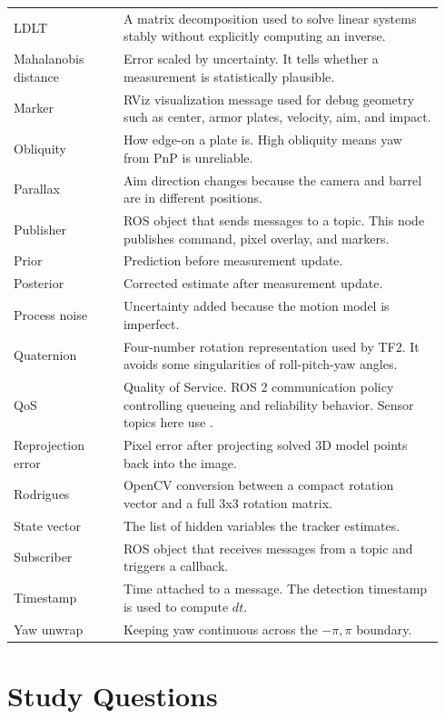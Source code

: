 \documentclass[11pt,a4paper]{article}
\newcommand{\code}[1]{\ifmmode\text{\ttfamily\detokenize{#1}}\else\texttt{\detokenize{#1}}\fi}
\begin{document}
\begin{longtable}{p{0.24\linewidth} p{0.70\linewidth}}
LDLT & A matrix decomposition used to solve linear systems stably without explicitly computing an inverse. \\
Mahalanobis distance & Error scaled by uncertainty. It tells whether a measurement is statistically plausible. \\
Marker & RViz visualization message used for debug geometry such as center, armor plates, velocity, aim, and impact. \\
Obliquity & How edge-on a plate is. High obliquity means yaw from PnP is unreliable. \\
Parallax & Aim direction changes because the camera and barrel are in different positions. \\
Publisher & ROS object that sends messages to a topic. This node publishes command, pixel overlay, and markers. \\
Prior & Prediction before measurement update. \\
Posterior & Corrected estimate after measurement update. \\
Process noise & Uncertainty added because the motion model is imperfect. \\
Quaternion & Four-number rotation representation used by TF2. It avoids some singularities of roll-pitch-yaw angles. \\
QoS & Quality of Service. ROS 2 communication policy controlling queueing and reliability behavior. Sensor topics here use \code{SensorDataQoS}. \\
Reprojection error & Pixel error after projecting solved 3D model points back into the image. \\
Rodrigues & OpenCV conversion between a compact rotation vector \code{rvec} and a full 3x3 rotation matrix. \\
State vector & The list of hidden variables the tracker estimates. \\
Subscriber & ROS object that receives messages from a topic and triggers a callback. \\
Timestamp & Time attached to a message. The detection timestamp is used to compute \(dt\). \\
Yaw unwrap & Keeping yaw continuous across the \(-\pi,\pi\) boundary. \\
\bottomrule
\end{longtable}

\section{Study Questions}
\end{document}
